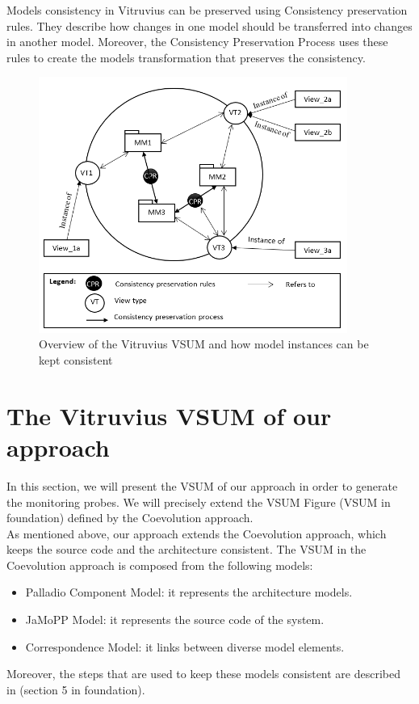 Models consistency in Vitruvius can be preserved using Consistency preservation rules. They describe how changes in one model should be transferred into changes in another model. Moreover, the Consistency Preservation Process uses these rules to create the models transformation that preserves the consistency.\\


\begin{figure}[h]
\centering
\includegraphics[width=0.9\textwidth]{figures/vitruv_vsum}
\caption{Overview of the Vitruvius VSUM and how model instances can be kept consistent}
\label{fig:vitruv_vsum}
\end{figure}



\section{The Vitruvius VSUM of our approach}
\label{sec:The Vitruvius VSUM of our approach}

In this section, we will present the VSUM of our approach in order to generate the monitoring probes. We will precisely extend the VSUM Figure (VSUM in foundation) defined by the Coevolution approach.\\

As mentioned above, our approach extends the Coevolution approach, which keeps the source code and the architecture consistent. The VSUM in the Coevolution approach is composed from the following models:
\begin{itemize}
\item Palladio Component Model: it represents the architecture models.
\item JaMoPP Model: it represents the source code of the system.
\item Correspondence Model: it links between diverse model elements.
\end{itemize}
Moreover, the steps that are used to keep these models consistent are described in (section 5 in foundation). \\

